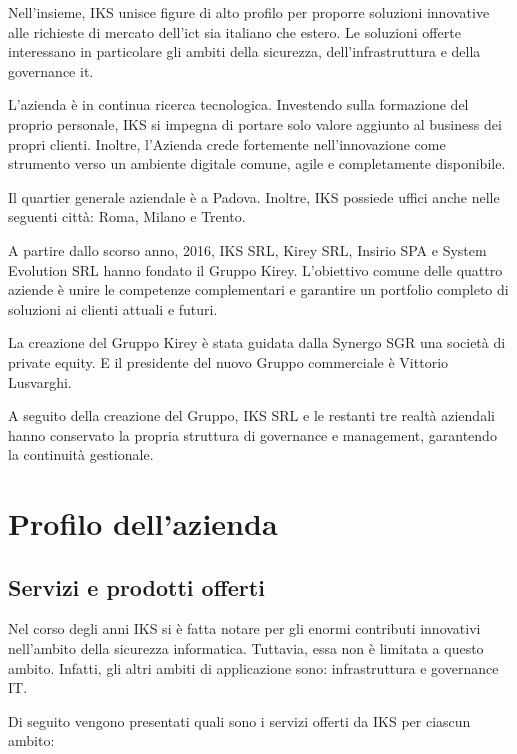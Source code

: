 Nell'insieme, IKS unisce figure di alto profilo per proporre soluzioni 
innovative alle richieste di mercato dell'\gls{ict} sia italiano che estero. 
Le soluzioni offerte interessano in particolare gli ambiti della sicurezza, 
dell'infrastruttura e della governance \gls{it}.  

L'azienda è in continua ricerca tecnologica. Investendo sulla formazione del 
proprio personale, IKS si impegna di portare solo valore aggiunto al business 
dei propri clienti. Inoltre, l'Azienda crede fortemente nell'innovazione come 
strumento verso un ambiente digitale comune, \gls{agile} e completamente disponibile. 

Il quartier generale aziendale è a Padova. Inoltre, IKS possiede uffici 
anche nelle seguenti città: Roma, Milano e Trento.

A partire dallo scorso anno, 2016, IKS SRL, Kirey SRL, Insirio SPA e 
System Evolution SRL hanno  fondato il Gruppo Kirey. L'obiettivo comune delle 
quattro aziende è unire le competenze complementari e garantire un portfolio 
completo di soluzioni ai clienti attuali e futuri. 

La creazione del Gruppo Kirey è stata guidata dalla Synergo SGR una società di 
\gls{private equity}. E il presidente del nuovo Gruppo commerciale è Vittorio Lusvarghi.   

A seguito della creazione del Gruppo, IKS SRL e le restanti tre realtà aziendali 
hanno conservato la propria struttura di governance e management, garantendo 
la continuità gestionale. 

\section{Profilo dell'azienda}
\subsection{Servizi e prodotti offerti}
Nel corso degli anni IKS si è fatta notare per gli enormi contributi innovativi 
nell'ambito della sicurezza informatica. Tuttavia, essa non è limitata a 
questo ambito. Infatti, gli altri ambiti di applicazione sono: infrastruttura e governance IT. 

Di seguito vengono presentati quali sono i servizi offerti da IKS per ciascun ambito:

